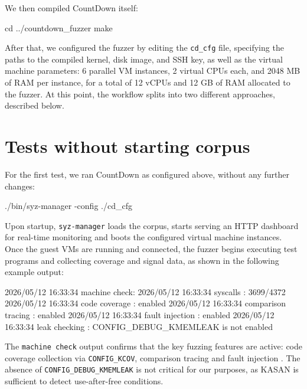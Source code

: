 We then compiled CountDown itself:

\begin{bashlncode}
cd ../countdown_fuzzer
make
\end{bashlncode}

\noindent After that, we configured the fuzzer by editing the \texttt{cd\_cfg} file, specifying the paths to the compiled kernel, disk image, and SSH key, as well as the virtual machine parameters: 6 parallel VM instances, 2 virtual CPUs each, and 2048 MB of RAM per instance, for a total of 12 vCPUs and 12 GB of RAM allocated to the fuzzer. At this point, the workflow splits into two different approaches, described below.

\section{Tests without starting corpus}

For the first test, we ran CountDown as configured above, without any further changes:

\begin{bashlncode}
./bin/syz-manager -config ./cd_cfg
\end{bashlncode}

\noindent Upon startup, \texttt{syz-manager} loads the corpus, starts serving an HTTP dashboard for real-time monitoring and boots the configured virtual machine instances. Once the guest VMs are running and connected, the fuzzer begins executing test programs and collecting coverage and signal data, as shown in the following example output:

\begin{bashlncode}
2026/05/12 16:33:34 machine check:
2026/05/12 16:33:34 syscalls               : 3699/4372
2026/05/12 16:33:34 code coverage           : enabled
2026/05/12 16:33:34 comparison tracing      : enabled
2026/05/12 16:33:34 fault injection         : enabled
2026/05/12 16:33:34 leak checking           : CONFIG_DEBUG_KMEMLEAK is not enabled
\end{bashlncode}

\noindent The \texttt{machine check} output confirms that the key fuzzing features are active: code coverage collection via \texttt{CONFIG\_KCOV}, comparison tracing and fault injection \cite{bib:syzkaller-coverage}. The absence of \texttt{CONFIG\_DEBUG\_KMEMLEAK} \cite{bib:config-debug-kmemleak} is not critical for our purposes, as KASAN \cite{bib:kasan} is sufficient to detect use-after-free conditions.

